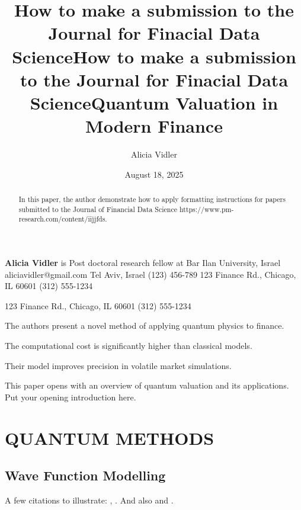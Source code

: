 \documentclass{jfds}
\title{How to make a submission to the Journal for Finacial Data Science}
\date{August 18, 2025}
\author{Alicia Vidler}
\begin{document}
\maketitle

\authorbio
      {\textbf{Alicia Vidler} is Post doctoral research fellow at Bar Ilan University, Israel}
  {aliciavidler@gmail.com}
  {Tel Aviv, Israel}
  {(123) 456-789}
 {123 Finance Rd., Chicago, IL 60601}
  {(312) 555-1234}

 {123 Finance Rd., Chicago, IL 60601}
  {(312) 555-1234}


\begin{abstract}
In this paper, the author demonstrate how to apply formatting instructions for papers submitted to the Journal of Financial Data Science https://www.pm-research.com/content/iijjfds.
\end{abstract}

\begin{keyfindings}
  \item The authors present a novel method of applying quantum physics to finance.
  \item The computational cost is significantly higher than classical models.
  \item Their model improves precision in volatile market simulations.
\end{keyfindings}

\newpage



\title{How to make a submission to the Journal for Finacial Data Science}
\printtitleonly


This paper opens with an overview of quantum valuation and its applications. Put your opening introduction here.


\title{Quantum Valuation in Modern Finance}
\section{QUANTUM METHODS}

\subsection{Wave Function Modelling}
A few citations to illustrate: \cite{doe2023working}, \cite{smith2021quantum}. And also \cite{morningstar2022data} and \cite{tesler2018market}.
\end{document}
